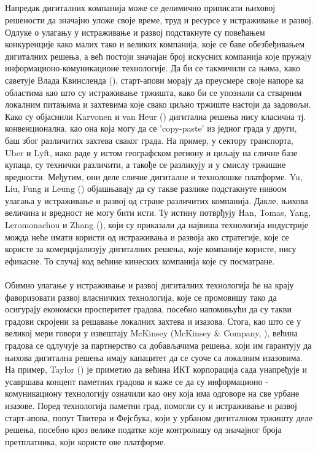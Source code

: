 \documentclass{article}
\begin{document}
\\\\\\\\
Напредак дигиталних компанија може се делимично приписати њиховој решености да значајно уложе своје време, труд и ресурсе у истраживање и развој. Одлуке о улагању у истраживање и развој подстакнуте су повећањем конкуренције како малих тако и великих компанија, које се баве обезбеђивањем дигиталних решења, а већ постоји значајан број искусних компанија које пружају информационо-комуникационе технологије. Да би се такмичили са њима, како саветује Влада Квинсленда (\cite{q_2016}), старт-апови морају да преусмере своје напоре ка областима као што су истраживање тржишта, како би се упознали са стварним локалним питањима и захтевима које свако циљно тржиште настоји да задовољи. Како су објаснили Karvonen и van Heur (\cite{v_h_2014}) дигитална решења нису класична тј. конвенционална, као она која могу да се 'copy-paste' из једног града у други, баш због различитих захтева сваког града. На пример, у сектору транспорта, Uber и Lyft, иако раде у истом географском региону и циљају на сличне базе купаца, су технички различити, а такође се разликују и у смислу тржишне вредности. Међутим, они деле сличне дигиталне и технолошке платформе. Yu, Liu, Fung и Leung  (\cite{l_2018}) објашњавају да су такве разлике подстакнуте нивоом улагања у истраживање и развој од стране различитих компанија. Дакле, њихова величина и вредност не могу бити исти. Ту истину потврђују Han, Tomas, Yang, Leromonachou и Zhang (\cite{zhang_2017}), који су приказали да највиша технологија индустрије можда неће имати користи од истраживања и развоја ако стратегије, које се користе за комерцијализују дигиталних решења, које компаније користе, нису ефикасне. То случај код већине кинеских компанија које су посматране.
\\\\
Обимно улагање у истраживање и развој дигиталних технологија ће на крају фаворизовати развој власничких технологија, које се промовишу тако да осигурају економски просперитет градова, посебно напомињући да су такви градови скројени за решавање локалних захтева и изазова. Стога, као што се у великој мери говори у извештају McKinsey (McKinsey \& Company, \cite{mc_2018a}), већина градова се одлучује за партнерство са добављачима решења, који им гарантују да њихова дигитална решења имају капацитет да се суоче са локалним изазовима. На пример, Taylor (\cite{t_2014}) је приметио да већина ИКТ корпорација сада унапређује и усавршава концепт паметних градова и каже се да су информационо - комуникациону технологију означили као ону која има одговоре на све урбане изазове. Поред технологија паметни град, помогли су и истраживање и развој старт-апова, попут Твитера и Фејсбука, који у урбаном дигиталном тржишту деле решења, посебно кроз велике податке које контролишу од значајног броја претплатника, који користе ове платформе.
\newpage
\end{document}
